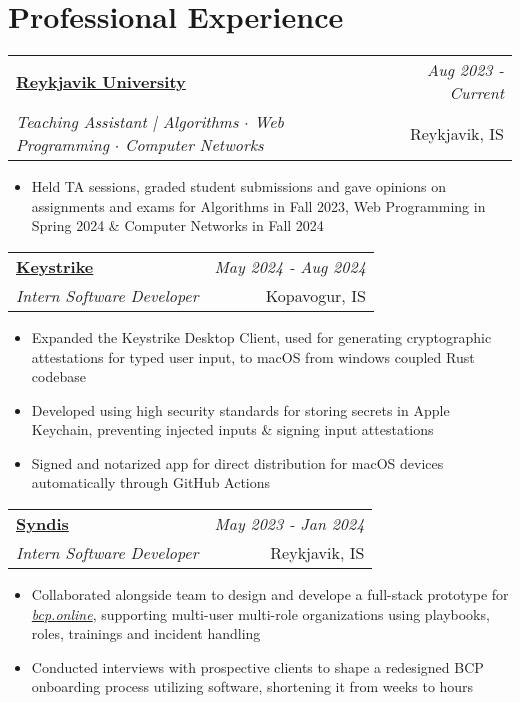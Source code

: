 \documentclass{article}
\makeatletter
\newcommand{\resumeSubheading}[4]{
\vspace{2mm}
    \begin{tabular*}{0.99\textwidth}[t]{l@{\extracolsep{\fill}}r}
		\textbf{\normalsize{#1}} & \textit{\normalsize{#4}} \\
        \textit{\normalsize{#3}} &  \normalsize{#2}\\
    \end{tabular*}
    \vspace{-2mm}
}
\newcommand{\resumeSubHeadingListStart}{}
\newcommand{\resumeItemListStart}{\begin{itemize}[leftmargin=*,labelsep=1mm,itemsep=-0.2mm]\normalsize}
\newcommand{\resumeItemListEnd}{\end{itemize}\vspace{-2mm}}
\makeatother
\begin{document}
\vspace{-3mm}
\section{\textbf{Professional Experience}}
\vspace{-0.4mm}
  \resumeSubHeadingListStart

  \resumeSubheading
  {\href{https://www.ru.is}{Reykjavik University}}{Reykjavik, IS}
    {Teaching Assistant | Algorithms $\cdot$ Web Programming $\cdot$ Computer Networks}{Aug 2023 - Current}
    \resumeItemListStart
	  \item Held TA sessions, graded student submissions and gave opinions on assignments and exams for Algorithms in Fall 2023, Web Programming in Spring 2024 \& Computer Networks in Fall 2024
    \resumeItemListEnd

  \resumeSubheading
      {\href{https://keystrike.com}{Keystrike}}{Kopavogur, IS}
	  {Intern Software Developer}{May 2024 - Aug 2024}
      \resumeItemListStart
	    \item Expanded the Keystrike Desktop Client, used for generating cryptographic attestations for typed user input, to macOS from windows coupled Rust codebase



		\item Developed using high security standards for storing secrets in Apple Keychain, preventing injected inputs \& signing input attestations

		\item Signed and notarized app for direct distribution for macOS devices automatically through GitHub Actions 
      \resumeItemListEnd 

  \resumeSubheading
    {\href{https://www.syndis.is}{Syndis}}{Reykjavik, IS}
    {Intern Software Developer}{May 2023 - Jan 2024}
    \resumeItemListStart
\item Collaborated alongside team to design and develope a full-stack prototype for \href{https://bcp.online}{\emph{bcp.online}}, supporting multi-user multi-role organizations using playbooks, roles, trainings and incident handling

	  \item Conducted interviews with prospective clients to shape a redesigned BCP onboarding process utilizing software, shortening it from weeks to hours
    \resumeItemListEnd
	
\end{document}
